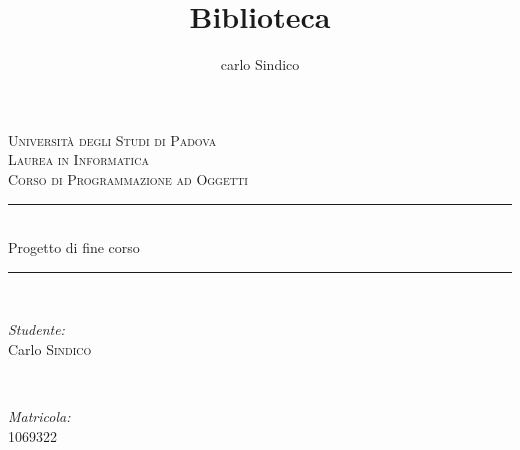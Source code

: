 \documentclass[10pt]{article}
\title{Biblioteca}
\author{carlo Sindico}
\begin{document}



\begin{titlepage}

\newcommand{\HRule}{\rule{\linewidth}{0.5mm}} %

\center %
 

\textsc{\LARGE Universit\`a degli Studi di Padova}\\[1.5cm] %
\textsc{\Large Laurea in Informatica}\\[0.5cm] %
\textsc{\large Corso di Programmazione ad Oggetti}\\[0.5cm] %


\HRule \\[0.4cm]
{ \huge  Progetto di fine corso}\\[0.3cm] %
\HRule \\[1.5cm]
 

\begin{minipage}{0.4\textwidth}
\begin{flushleft} \large
\emph{Studente:}\\
Carlo \textsc{Sindico} %
\end{flushleft}
\end{minipage}
~
\begin{minipage}{0.4\textwidth}
\begin{flushright} \large
\emph{Matricola:} \\
\textsc{1069322} %
\end{flushright}
\end{minipage}\\[4cm]


\end{titlepage}
\end{document}
